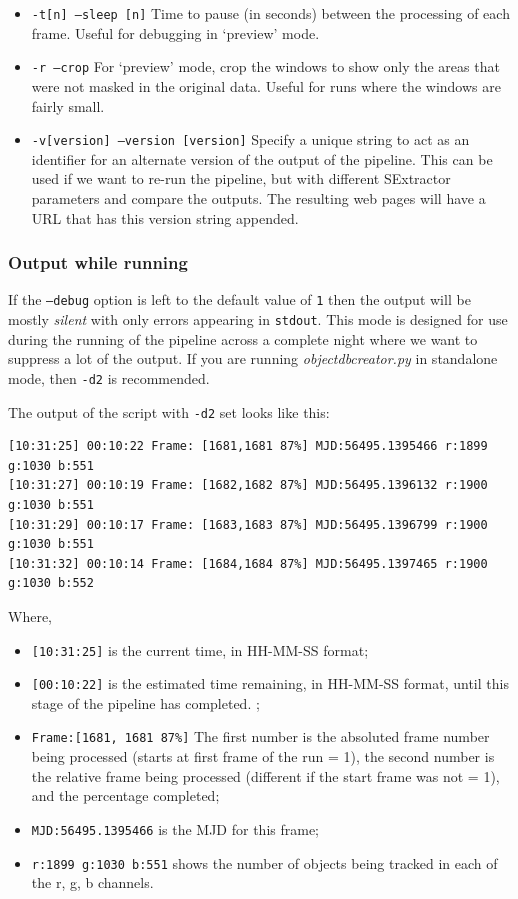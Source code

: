\begin{itemize}
  \item \texttt{-t[n] --sleep [n]} Time to pause (in seconds) between the processing of each frame. Useful for debugging in `preview' mode. 
  \item \texttt{-r --crop} For `preview' mode, crop the windows to show only the areas that were not masked in the original data. Useful for runs where the windows are fairly small. 
  \item \texttt{-v[version] --version [version]} Specify a unique string to act as an identifier for an alternate version of the output of the pipeline. This can be used if we want to re-run the pipeline, but with different SExtractor parameters and compare the outputs. The resulting web pages will have a URL that has this version string appended.    

\end{itemize}

\subsubsection{Output while running}
If the \texttt{--debug} option is left to the default value of \texttt{1} then the output will be mostly \emph{silent} with only errors appearing in \texttt{stdout}. This mode is designed for use during the running of the pipeline across a complete night where we want to suppress a lot of the output. If you are running \emph{objectdbcreator.py} in standalone mode, then \texttt{-d2} is recommended. 

The output of the script with \texttt{-d2} set looks like this:

\begin{lstlisting}
[10:31:25] 00:10:22 Frame: [1681,1681 87%] MJD:56495.1395466 r:1899 g:1030 b:551 
[10:31:27] 00:10:19 Frame: [1682,1682 87%] MJD:56495.1396132 r:1900 g:1030 b:551 
[10:31:29] 00:10:17 Frame: [1683,1683 87%] MJD:56495.1396799 r:1900 g:1030 b:551 
[10:31:32] 00:10:14 Frame: [1684,1684 87%] MJD:56495.1397465 r:1900 g:1030 b:552 
\end{lstlisting}

Where, 
\begin{itemize}
  \item \texttt{[10:31:25]} is the current time, in HH-MM-SS format;
  \item \texttt{[00:10:22]} is the estimated time remaining, in HH-MM-SS format, until this stage of the pipeline has completed. ;
  \item \texttt{Frame:[1681, 1681 87\%]} The first number is the absoluted frame number being processed (starts at first frame of the run = 1), the second number is the relative frame being processed (different if the start frame was not = 1), and the percentage completed;
  \item \texttt{MJD:56495.1395466} is the MJD for this frame;
  \item \texttt{r:1899 g:1030 b:551} shows the number of objects being tracked in each of the r, g, b channels.
\end{itemize}

